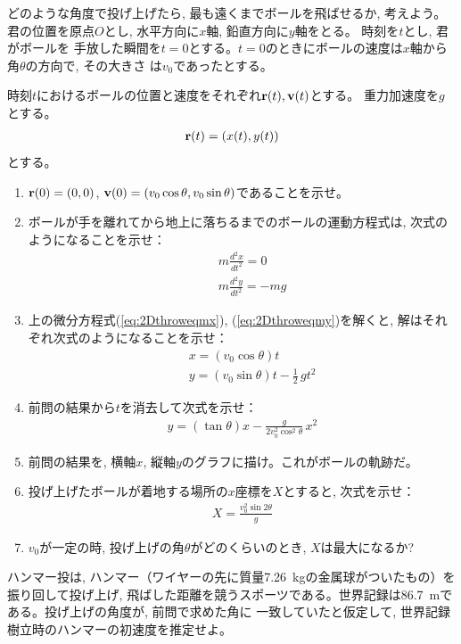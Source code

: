 \begin{q}\label{q:2Dthrow}
どのような角度で投げ上げたら, 最も遠くまでボールを飛ばせるか, 考えよう。
君の位置を原点$O$とし, 水平方向に$x$軸, 鉛直方向に$y$軸をとる。 時刻を$t$とし, 君がボールを
手放した瞬間を$t=0$とする。$t=0$のときにボールの速度は$x$軸から角$\theta$の方向で, その大きさ
は$v_0$であったとする。

時刻$t$におけるボールの位置と速度をそれぞれ${\bf r}(t), {\bf v}(t)$とする。
重力加速度を$g$とする。
\begin{eqnarray*}{\bf r}(t)=(x(t), y(t))\end{eqnarray*}
とする。
\begin{enumerate}
\item ${\bf r}(0)=(0, 0)$, ${\bf v}(0)=(v_0\cos\theta, v_0\sin\theta)$であることを示せ。
\item ボールが手を離れてから地上に落ちるまでのボールの運動方程式は, 
次式のようになることを示せ：
\begin{eqnarray}
&&m\frac{d^2x}{dt^2}=0\label{eq:2Dthroweqmx}\\
&&m\frac{d^2y}{dt^2}=-mg\label{eq:2Dthroweqmy}
\end{eqnarray}
\item 上の微分方程式(\ref{eq:2Dthroweqmx}), (\ref{eq:2Dthroweqmy})を解くと, 
解はそれぞれ次式のようになることを示せ：
\begin{eqnarray}
&&x=(v_0\cos\theta)t\\
&&y=(v_0\sin\theta)t-\frac{1}{2}\,gt^2
\end{eqnarray}
\item 前問の結果から$t$を消去して次式を示せ：
\begin{eqnarray}
y=(\tan\theta)x-\frac{g}{2v_0^2\cos^2\theta}\,x^2\label{eq:throwtilt}
\end{eqnarray}
\item 前問の結果を, 横軸$x$, 縦軸$y$のグラフに描け。これがボールの軌跡だ。
\item 投げ上げたボールが着地する場所の$x$座標を$X$とすると, 次式を示せ：
\begin{eqnarray}
X=\frac{v_0^2\sin2\theta}{g}\label{eq:throwtiltX}
\end{eqnarray}
\item $v_0$が一定の時, 投げ上げの角$\theta$がどのくらいのとき, $X$は最大になるか? 
\end{enumerate}
\end{q}
\vspace{0.2cm}

\begin{q}\label{q:2Dthrow_hammer}
ハンマー投は, ハンマー（ワイヤーの先に質量7.26~kgの金属球がついたもの）を振り回して投げ上げ, 
飛ばした距離を競うスポーツである。世界記録は86.7~mである。投げ上げの角度が, 前問で求めた角に
一致していたと仮定して, 世界記録樹立時のハンマーの初速度を推定せよ。
\end{q}
\vspace{0.6cm}



